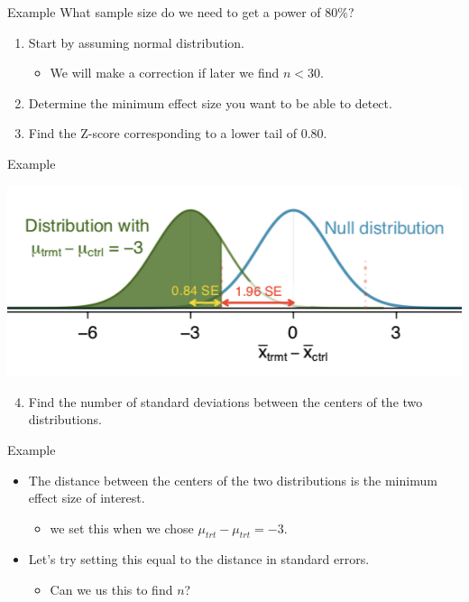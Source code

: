 \begin{frame}{Example}
    What sample size do we need to get a power of 80\%?
    \begin{enumerate}
        \item<1-> Start by assuming normal distribution.
        \begin{itemize}
            \item We will make a correction if later we find $n < 30$.
        \end{itemize}
        \item<2-> Determine the minimum effect size you want to be able to detect.
        \item<3-> Find the Z-score corresponding to a lower tail of 0.80.
    \end{enumerate}
\end{frame}

\begin{frame}{Example}
    \begin{center}
        \includegraphics[scale=0.4]{images/nullaltdist.png}
    \end{center}
    \begin{enumerate}\setcounter{enumi}{3}
        \item Find the number of standard deviations between the centers of the two distributions.
    \end{enumerate}
\end{frame}

\begin{frame}{Example}
    \begin{itemize}
        \item The distance between the centers of the two distributions is the minimum effect size of interest.
        \begin{itemize}
            \item we set this when we chose $\mu_{trt} - \mu_{trt} = -3$.
        \end{itemize}
        \item Let's try setting this equal to the distance in standard errors.
        \begin{itemize}
            \item Can we us this to find $n$?
        \end{itemize}
    \end{itemize}
\end{frame}

